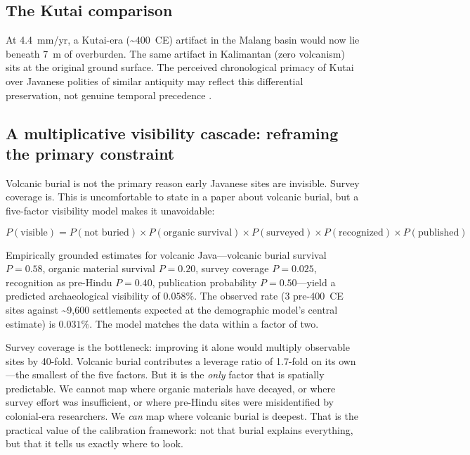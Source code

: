 \documentclass[12pt,a4paper]{article}
\begin{document}
\subsection{The Kutai comparison}

At 4.4~mm/yr, a Kutai-era (\textasciitilde400~CE) artifact in the Malang basin would now lie beneath 7~m of overburden. The same artifact in Kalimantan (zero volcanism) sits at the original ground surface. The perceived chronological primacy of Kutai over Javanese polities of similar antiquity may reflect this differential preservation, not genuine temporal precedence \citep{coedes1968}.

\subsection{A multiplicative visibility cascade: reframing the primary constraint}

Volcanic burial is not the primary reason early Javanese sites are invisible. Survey coverage is. This is uncomfortable to state in a paper about volcanic burial, but a five-factor visibility model makes it unavoidable:

\begin{equation}
  P(\text{visible}) = P(\text{not buried}) \times P(\text{organic survival}) \times P(\text{surveyed}) \times P(\text{recognized}) \times P(\text{published})
\end{equation}

Empirically grounded estimates for volcanic Java---volcanic burial survival $P = 0.58$, organic material survival $P = 0.20$, survey coverage $P = 0.025$, recognition as pre-Hindu $P = 0.40$, publication probability $P = 0.50$---yield a predicted archaeological visibility of $0.058\%$. The observed rate (3 pre-400~CE sites against \textasciitilde9,600 settlements expected at the demographic model's central estimate) is $0.031\%$. The model matches the data within a factor of two.

Survey coverage is the bottleneck: improving it alone would multiply observable sites by 40-fold. Volcanic burial contributes a leverage ratio of 1.7-fold on its own---the smallest of the five factors. But it is the \textit{only} factor that is spatially predictable. We cannot map where organic materials have decayed, or where survey effort was insufficient, or where pre-Hindu sites were misidentified by colonial-era researchers. We \textit{can} map where volcanic burial is deepest. That is the practical value of the calibration framework: not that burial explains everything, but that it tells us exactly where to look.
\end{document}
